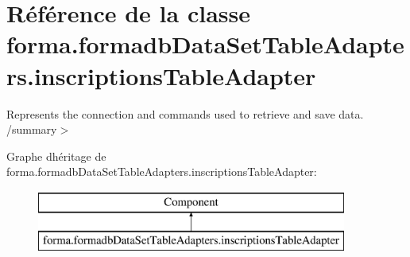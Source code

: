 \hypertarget{classforma_1_1formadb_data_set_table_adapters_1_1inscriptions_table_adapter}{}\section{Référence de la classe forma.\+formadb\+Data\+Set\+Table\+Adapters.\+inscriptions\+Table\+Adapter}
\label{classforma_1_1formadb_data_set_table_adapters_1_1inscriptions_table_adapter}


Represents the connection and commands used to retrieve and save data. /summary$>$  


Graphe d\textquotesingle{}héritage de forma.\+formadb\+Data\+Set\+Table\+Adapters.\+inscriptions\+Table\+Adapter\+:\begin{figure}[H]
\begin{center}
\leavevmode
\includegraphics[height=2.000000cm]{classforma_1_1formadb_data_set_table_adapters_1_1inscriptions_table_adapter}
\end{center}
\end{figure}
